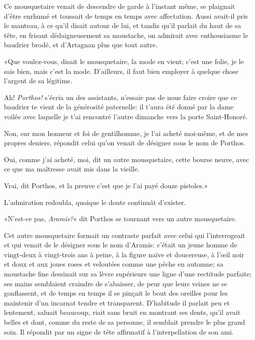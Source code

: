 Ce mousquetaire venait de descendre de garde à l'instant même, se plaignait d'être enrhumé et toussait de temps en temps avec affectation. Aussi avait-il pris le manteau, à ce qu'il disait autour de lui, et tandis qu'il parlait du haut de sa tête, en frisant dédaigneusement sa moustache, on admirait avec enthousiasme le baudrier brodé, et d'Artagnan plus que tout autre. 

«Que voulez-vous, disait le mousquetaire, la mode en vient; c'est une folie, je le sais bien, mais c'est la mode. D'ailleurs, il faut bien employer à quelque chose l'argent de sa légitime. 

\speak  Ah! \textit{Porthos!} s'écria un des assistants, n'essaie pas de nous faire croire que ce baudrier te vient de la générosité paternelle: il t'aura été donné par la dame voilée avec laquelle je t'ai rencontré l'autre dimanche vers la porte Saint-Honoré. 

\speak  Non, sur mon honneur et foi de gentilhomme, je l'ai acheté moi-même, et de mes propres deniers, répondit celui qu'on venait de désigner sous le nom de Porthos. 

\speak  Oui, comme j'ai acheté, moi, dit un autre mousquetaire, cette bourse neuve, avec ce que ma maîtresse avait mis dans la vieille. 

\speak  Vrai, dit Porthos, et la preuve c'est que je l'ai payé douze pistoles.» 

L'admiration redoubla, quoique le doute continuât d'exister. 

«N'est-ce pas, \textit{Aramis?}» dit Porthos se tournant vers un autre mousquetaire. 

Cet autre mousquetaire formait un contraste parfait avec celui qui l'interrogeait et qui venait de le désigner sous le nom d'Aramis: c'était un jeune homme de vingt-deux à vingt-trois ans à peine, à la figure naïve et doucereuse, à l'œil noir et doux et aux joues roses et veloutées comme une pêche en automne; sa moustache fine dessinait sur sa lèvre supérieure une ligne d'une rectitude parfaite; ses mains semblaient craindre de s'abaisser, de peur que leurs veines ne se gonflassent, et de temps en temps il se pinçait le bout des oreilles pour les maintenir d'un incarnat tendre et transparent. D'habitude il parlait peu et lentement, saluait beaucoup, riait sans bruit en montrant ses dents, qu'il avait belles et dont, comme du reste de sa personne, il semblait prendre le plus grand soin. Il répondit par un signe de tête affirmatif à l'interpellation de son ami. 

